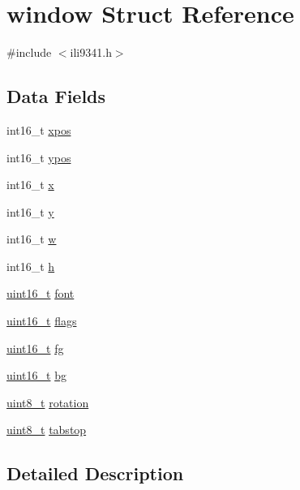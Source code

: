 \hypertarget{structwindow}{\section{window Struct Reference}
\label{structwindow}
}


{\ttfamily \#include $<$ili9341.\-h$>$}

\subsection*{Data Fields}
\begin{DoxyCompactItemize}
\item 
int16\-\_\-t \hyperlink{structwindow_a890a7dba31e7328500f4e5e41e51aab7}{xpos}
\item 
int16\-\_\-t \hyperlink{structwindow_a64bdec4f0ee274a96d696b16de783746}{ypos}
\item 
int16\-\_\-t \hyperlink{structwindow_a879b99940dfc34772f0257f54c67b817}{x}
\item 
int16\-\_\-t \hyperlink{structwindow_a95c7023fc42e79ab42c291b90a490776}{y}
\item 
int16\-\_\-t \hyperlink{structwindow_ad89fdeb11ce94e2e7501f7290372d6ae}{w}
\item 
int16\-\_\-t \hyperlink{structwindow_a822391abd5d09e6ce7152f68cff3ef2b}{h}
\item 
\hyperlink{send_8c_a273cf69d639a59973b6019625df33e30}{uint16\-\_\-t} \hyperlink{structwindow_acee24e56db43557a46cbb5ca3fe35021}{font}
\item 
\hyperlink{send_8c_a273cf69d639a59973b6019625df33e30}{uint16\-\_\-t} \hyperlink{structwindow_ad58fae853f87093ef4f0139df0a3f33d}{flags}
\item 
\hyperlink{send_8c_a273cf69d639a59973b6019625df33e30}{uint16\-\_\-t} \hyperlink{structwindow_ac8739cdb3c50efcc1deaa5ab955a5e62}{fg}
\item 
\hyperlink{send_8c_a273cf69d639a59973b6019625df33e30}{uint16\-\_\-t} \hyperlink{structwindow_affcf5d29153103c2537542f5a4f8ba87}{bg}
\item 
\hyperlink{send_8c_aba7bc1797add20fe3efdf37ced1182c5}{uint8\-\_\-t} \hyperlink{structwindow_afbd48ebcb41e68d0f458dac593578aa8}{rotation}
\item 
\hyperlink{send_8c_aba7bc1797add20fe3efdf37ced1182c5}{uint8\-\_\-t} \hyperlink{structwindow_a88d2836d45dd428d8fadfd703f0f965f}{tabstop}
\end{DoxyCompactItemize}


\subsection{Detailed Description}


